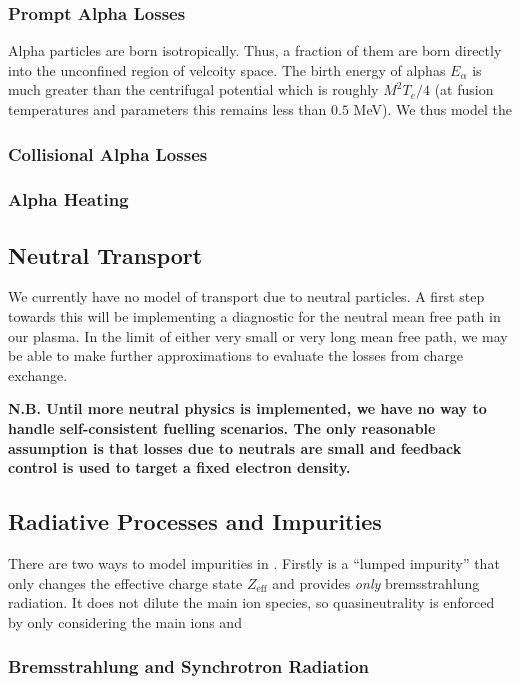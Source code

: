 \documentclass{revtex4}
\begin{document}
\subsubsection{Prompt Alpha Losses}
Alpha particles are born isotropically. Thus, a fraction of them are born directly into the unconfined region of velcoity space.
The birth energy of alphas $E_\alpha$ is much greater than the centrifugal potential which is roughly $M^2 T_e / 4$ (at fusion temperatures and parameters this remains
less than $0.5$ MeV). We thus model the 
\subsubsection{Collisional Alpha Losses}
\subsubsection{Alpha Heating}

\subsection{Neutral Transport}
We currently have no model of transport due to neutral particles. A first step towards this will be implementing a diagnostic for 
the neutral mean free path in our plasma. In the limit of either very small or very long mean free path, we may be able to make further approximations to evaluate the 
losses from charge exchange.

\textbf{N.B. Until more neutral physics is implemented, we have no way to handle self-consistent fuelling scenarios. The only reasonable assumption
	is that losses due to neutrals are small and feedback control is used to target a fixed electron density.}

\subsection{Radiative Processes and Impurities}
There are two ways to model impurities in \mctrans{}. Firstly is a ``lumped impurity'' that only changes the effective charge state $Z_{\mathrm{eff}}$ and 
provides \textit{only} bremsstrahlung radiation. It does not dilute the main ion species, so quasineutrality is enforced by only considering the main ions and 

\subsubsection{Bremsstrahlung and Synchrotron Radiation}
\end{document}
